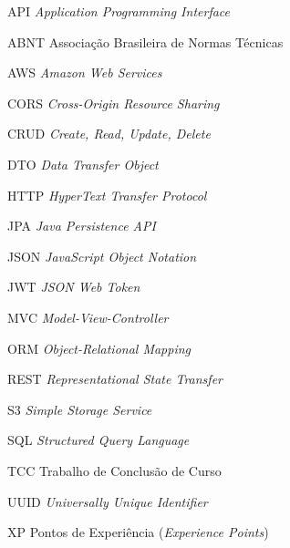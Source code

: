 \documentclass[
  12pt,             %
  openright,        %
  twoside,          %
  a4paper,          %
  english,          %
  brazilian         %
]{abntex2}
\begin{document}
\begin{siglas}
  \item[API]   \textit{Application Programming Interface}
  \item[ABNT]  Associação Brasileira de Normas Técnicas
  \item[AWS]   \textit{Amazon Web Services}
  \item[CORS]  \textit{Cross-Origin Resource Sharing}
  \item[CRUD]  \textit{Create, Read, Update, Delete}
  \item[DTO]   \textit{Data Transfer Object}
  \item[HTTP]  \textit{HyperText Transfer Protocol}
  \item[JPA]   \textit{Java Persistence API}
  \item[JSON]  \textit{JavaScript Object Notation}
  \item[JWT]   \textit{JSON Web Token}
  \item[MVC]   \textit{Model-View-Controller}
  \item[ORM]   \textit{Object-Relational Mapping}
  \item[REST]  \textit{Representational State Transfer}
  \item[S3]    \textit{Simple Storage Service}
  \item[SQL]   \textit{Structured Query Language}
  \item[TCC]   Trabalho de Conclusão de Curso
  \item[UUID]  \textit{Universally Unique Identifier}
  \item[XP]    Pontos de Experiência (\textit{Experience Points})
\end{siglas}

\tableofcontents*
\cleardoublepage

\textual








\postextual


\end{document}
